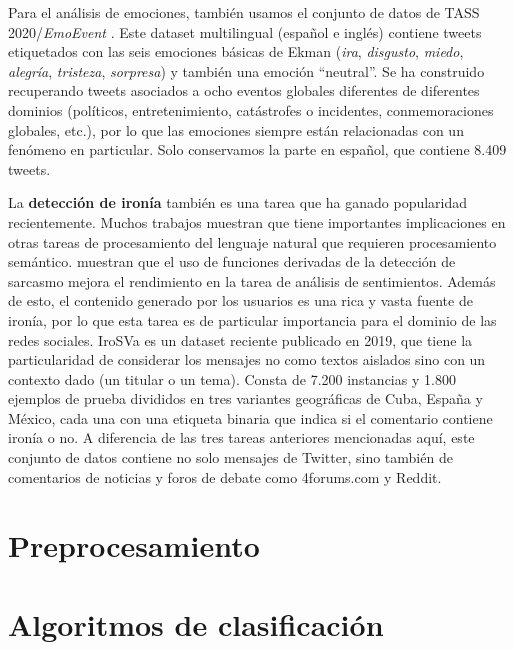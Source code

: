 Para el análisis de emociones, también usamos el conjunto de datos de TASS 2020/\emph{EmoEvent} \cite{plaza-del-arco-etal-2020-emoevent}. Este dataset multilingual (español e inglés) contiene tweets etiquetados con las seis emociones básicas de Ekman \cite{ekman1992argument} (\emph {ira}, \emph {disgusto}, \emph {miedo}, \emph {alegría}, \emph {tristeza}, \emph {sorpresa}) y también una emoción ``neutral''. Se ha construido recuperando tweets asociados a ocho eventos globales diferentes de diferentes dominios (políticos, entretenimiento, catástrofes o incidentes, conmemoraciones globales, etc.), por lo que las emociones siempre están relacionadas con un fenómeno en particular. Solo conservamos la parte en español, que contiene 8.409 tweets.


 La \textbf{detección de ironía} también es una tarea que ha ganado popularidad recientemente. Muchos trabajos muestran que tiene importantes implicaciones en otras tareas de procesamiento del lenguaje natural que requieren procesamiento semántico. \citet{gupta-yang-2017-crystalnest} muestran que el uso de funciones derivadas de la detección de sarcasmo mejora el rendimiento en la tarea de análisis de sentimientos. Además de esto, el contenido generado por los usuarios es una rica y vasta fuente de ironía, por lo que esta tarea es de particular importancia para el dominio de las redes sociales. IroSVa \cite {ortega2019overview} es un dataset reciente publicado en 2019, que tiene la particularidad de considerar los mensajes no como textos aislados sino con un contexto dado (un titular o un tema). Consta de 7.200 instancias y 1.800 ejemplos de prueba divididos en tres variantes geográficas de Cuba, España y México, cada una con una etiqueta binaria que indica si el comentario contiene ironía o no. A diferencia de las tres tareas anteriores mencionadas aquí, este conjunto de datos contiene no solo mensajes de Twitter, sino también de comentarios de noticias y foros de debate como 4forums.com y Reddit.


\section{Preprocesamiento}

\section{Algoritmos de clasificación}


